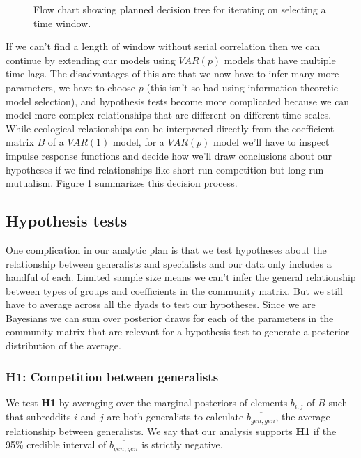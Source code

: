 \documentclass[12pt]{memoir}
\begin{document}
\begin{figure}[t]
  
  \caption{Flow chart showing planned decision tree for iterating on selecting a time window. \label{fig:analytic_plan}}
\end{figure}

If we can't find a length of window without serial correlation then we can continue by extending our models using $VAR(p)$ models that have multiple time lags. The disadvantages of this are that we now have to infer many more parameters, we have to choose $p$ (this isn't so bad using information-theoretic model selection), and hypothesis tests become more complicated because we can model more complex relationships that are different on different time scales. While ecological relationships can be interpreted directly from the coefficient matrix $B$ of a $VAR(1)$ model, for a $VAR(p)$ model we'll have to inspect impulse response functions and decide how we'll draw conclusions about our hypotheses if we find relationships like short-run competition but long-run mutualism.  Figure \ref{fig:analytic_plan} summarizes this decision process.

\subsection{Hypothesis tests}
\label{sec:hypothesis_tests}

One complication in our analytic plan is that we test hypotheses about the relationship between generalists and specialists and our data only includes a handful of each.  Limited sample size means we can't infer the general relationship between types of groups and coefficients in the community matrix.  But we still have to average across all the dyads to test our hypotheses. Since we are Bayesians we can sum over posterior draws for each of the parameters in the community matrix that are relevant for a hypothesis test to generate a posterior distribution of the average.  

\subsubsection{\textbf{H1:} Competition between generalists}

We test \textbf{H1} by averaging over the marginal posteriors of elements $b_{i,j}$ of $B$ such that subreddits $i$ and $j$ are both generalists to calculate $\overline{b_{gen,gen}}$, the average relationship between generalists. 
We say that our analysis supports \textbf{H1} if the 95\% credible interval of $\overline{b_{gen,gen}}$ is strictly negative.
\end{document}
